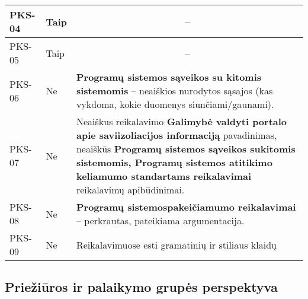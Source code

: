 \documentclass{VUMIFPSkursinis}
\begin{document}
\begin{center}
\begin{longtable}{|C{2cm}|L{2.5cm}|L{10cm}|}
		PKS-04                                          &
		Taip                                            &
		                                                                                                                                                                                                                                           \\ \hline
		PKS-05                                          &
		Taip                                              &
		     \\ \hline
		PKS-06                                          &
		Ne                                              &
		\textbf{Programų sistemos sąveikos su kitomis sistemomis} -- neaiškios nurodytos sąsajos (kas vykdoma, kokie duomenys siunčiami/gaunami). \\ \hline
		PKS-07                                          &
		Ne                                              &
		Neaiškus reikalavimo \textbf{Galimybė valdyti portalo apie saviizoliacijos informaciją} pavadinimas, neaiškūs \textbf{Programų sistemos sąveikos sukitomis sistemomis, Programų sistemos atitikimo keliamumo standartams reikalavimai} reikalavimų apibūdinimai.                                                                                                                                                                                             \\ \hline
		PKS-08                                          &
		Ne                                              &
		\textbf{Programų sistemospakeičiamumo reikalavimai} -- perkrautas, pateikiama argumentacija.                                                                                                                                                                                \\ \hline
		PKS-09                                          &
		Ne                                            &
		Reikalavimuose esti gramatinių ir stiliaus klaidų                                                                                                                                                                                                                                           \\ \hline
	\end{longtable}
\end{center}

\subsection{Priežiūros ir palaikymo grupės perspektyva}
\end{document}
